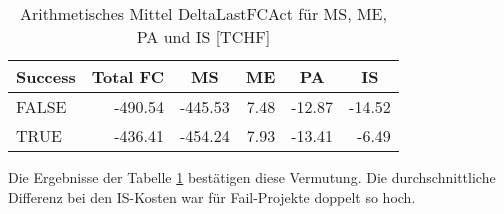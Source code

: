 \begin{table}[H]
	\centering
	\caption{Arithmetisches Mittel DeltaLastFCAct für MS, ME, PA und IS [TCHF]}
	\begin{tabular}{lrrrrr}
		\textbf{Success} & \multicolumn{1}{c}{\textbf{Total FC}} & \multicolumn{1}{c}{\textbf{MS}} & \multicolumn{1}{c}{\textbf{ME}} & \multicolumn{1}{c}{\textbf{PA}} & \multicolumn{1}{c}{\textbf{IS}}
		\\\hline
		FALSE & -490.54 & -445.53 & 7.48 & -12.87 & -14.52 \\
		TRUE  & -436.41 & -454.24 & 7.93 & -13.41 & -6.49\\
	\end{tabular}%
	\label{mdeltalastfcact}%
\end{table}%
Die Ergebnisse der Tabelle \ref{mdeltalastfcact} bestätigen diese Vermutung. Die durchschnittliche Differenz bei den IS-Kosten war für Fail-Projekte doppelt so hoch.

